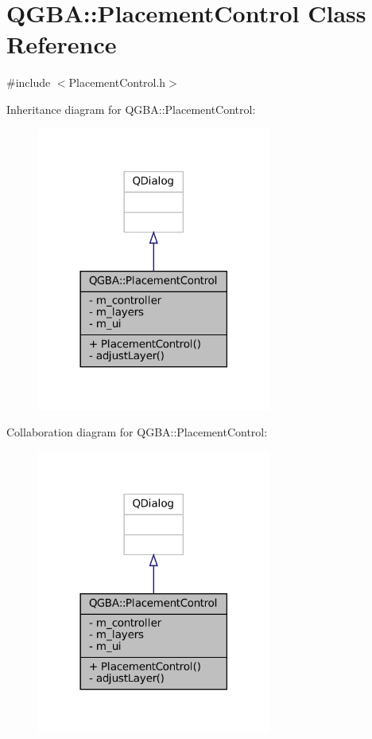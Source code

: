 \hypertarget{class_q_g_b_a_1_1_placement_control}{}\section{Q\+G\+BA\+:\+:Placement\+Control Class Reference}
\label{class_q_g_b_a_1_1_placement_control}


{\ttfamily \#include $<$Placement\+Control.\+h$>$}



Inheritance diagram for Q\+G\+BA\+:\+:Placement\+Control\+:
\nopagebreak
\begin{figure}[H]
\begin{center}
\leavevmode
\includegraphics[width=218pt]{class_q_g_b_a_1_1_placement_control__inherit__graph}
\end{center}
\end{figure}


Collaboration diagram for Q\+G\+BA\+:\+:Placement\+Control\+:
\nopagebreak
\begin{figure}[H]
\begin{center}
\leavevmode
\includegraphics[width=218pt]{class_q_g_b_a_1_1_placement_control__coll__graph}
\end{center}
\end{figure}
